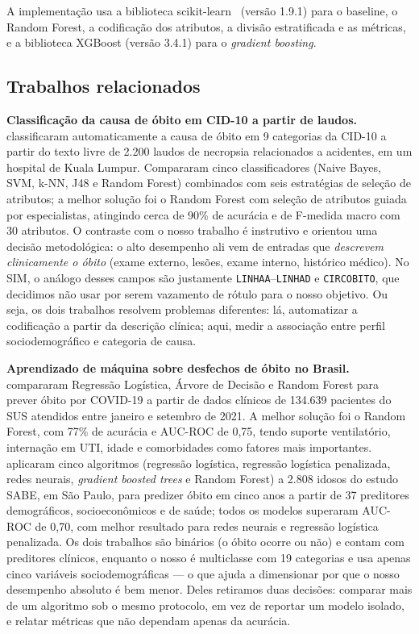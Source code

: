 \documentclass[12pt]{article}
\begin{document}
A implementação usa a biblioteca scikit-learn~\cite{pedregosa2011} (versão
1.9.1) para o baseline, o Random Forest, a codificação dos atributos, a
divisão estratificada e as métricas, e a biblioteca XGBoost (versão 3.4.1)
para o \emph{gradient boosting}.

\subsection{Trabalhos relacionados}

\textbf{Classificação da causa de óbito em CID-10 a partir de laudos.}
\cite{mujtaba2017} classificaram automaticamente a causa de óbito em 9
categorias da CID-10 a partir do texto livre de 2.200 laudos de necropsia
relacionados a acidentes, em um hospital de Kuala Lumpur. Compararam cinco
classificadores (Naive Bayes, SVM, k-NN, J48 e Random Forest) combinados com
seis estratégias de seleção de atributos; a melhor solução foi o Random
Forest com seleção de atributos guiada por especialistas, atingindo cerca de
90\% de acurácia e de F-medida macro com 30 atributos. O contraste com o
nosso trabalho é instrutivo e orientou uma decisão metodológica: o alto
desempenho ali vem de entradas que \emph{descrevem clinicamente o óbito}
(exame externo, lesões, exame interno, histórico médico). No SIM, o análogo
desses campos são justamente \texttt{LINHAA}--\texttt{LINHAD} e
\texttt{CIRCOBITO}, que decidimos não usar por serem vazamento de rótulo para
o nosso objetivo. Ou seja, os dois trabalhos resolvem problemas diferentes:
lá, automatizar a codificação a partir da descrição clínica; aqui, medir a
associação entre perfil sociodemográfico e categoria de causa.

\textbf{Aprendizado de máquina sobre desfechos de óbito no Brasil.}
\cite{silva2022} compararam Regressão Logística, Árvore de Decisão e
Random Forest para prever óbito por COVID-19 a partir de dados clínicos de
134.639 pacientes do SUS atendidos entre janeiro e setembro de 2021. A melhor
solução foi o Random Forest, com 77\% de acurácia e AUC-ROC de 0,75, tendo
suporte ventilatório, internação em UTI, idade e comorbidades como fatores
mais importantes. \cite{santos2019} aplicaram cinco algoritmos
(regressão logística, regressão logística penalizada, redes neurais,
\emph{gradient boosted trees} e Random Forest) a 2.808 idosos do estudo SABE,
em São Paulo, para predizer óbito em cinco anos a partir de 37 preditores
demográficos, socioeconômicos e de saúde; todos os modelos superaram AUC-ROC
de 0,70, com melhor resultado para redes neurais e regressão logística
penalizada. Os dois trabalhos são binários (o óbito ocorre ou não) e contam
com preditores clínicos, enquanto o nosso é multiclasse com 19 categorias e
usa apenas cinco variáveis sociodemográficas --- o que ajuda a dimensionar
por que o nosso desempenho absoluto é bem menor. Deles retiramos duas
decisões: comparar mais de um algoritmo sob o mesmo protocolo, em vez de
reportar um modelo isolado, e relatar métricas que não dependam apenas da
acurácia.
\end{document}
